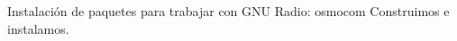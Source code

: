 \begin{frame}{Instalación de paquetes para trabajar con GNU Radio: osmocom}
Construimos e instalamos.


\end{frame}





